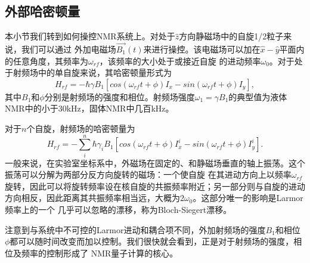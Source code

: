 \subsection{外部哈密顿量}

本小节我们转到如何操控NMR系统上。对处于$\hat{z}$方向静磁场中的自旋1/2粒子来说，我们可以通过
外加电磁场$\overrightarrow{B_1}(t)$来进行操控。该电磁场可以加在$\hat{x}-\hat{y}$平面内的任意角度，其频率为$\omega_{rf}$，该频率的大小处于或接近自旋
的进动频率$\omega_0$。对于处于射频场中的单自旋来说，其哈密顿量形式为
\begin{equation}\label{aaa}
H_{rf} =-\hbar\gamma B_1 [cos(\omega_{rf}t+\phi)I_x-sin(\omega_{rf}t+\phi)I_y],
\end{equation}
其中$B_1$和$\phi$分别是射频场的强度和相位。射频场强度$\omega_1=\gamma B_1$的典型值为液体NMR中的小于30kHz，固体NMR中几百kHz。

对于$n$个自旋，射频场的哈密顿量为
\begin{equation}\label{aaa}
H_{rf} =-\sum_i^n\hbar\gamma_i B_1 [cos(\omega_{rf}t+\phi)I_x^i-sin(\omega_{rf}t+\phi)I_y^i].
\end{equation}
一般来说，在实验室坐标系中，外磁场在固定的、和静磁场垂直的轴上振荡。这个振荡可以分解为两部分反方向旋转的磁场：一个使自旋
在其进动方向上以频率$\omega_{rf}$旋转，因此可以将旋转频率设在核自旋的共振频率附近；另一部分则与自旋的进动方向相反，因此距离其共振频率相当远，大概为$2\omega_0$。这部分唯一的影响是Larmor频率上的一个
几乎可以忽略的漂移，称为Bloch-Siegert漂移\cite{bshift}。

注意到与系统中不可控的Larmor进动和耦合项不同，外加射频场的强度$B_1$和相位$\phi$都可以随时间改变而加以控制。我们很快就会看到，正是对于射频场的强度，相位及频率的控制形成了
NMR量子计算的核心。

